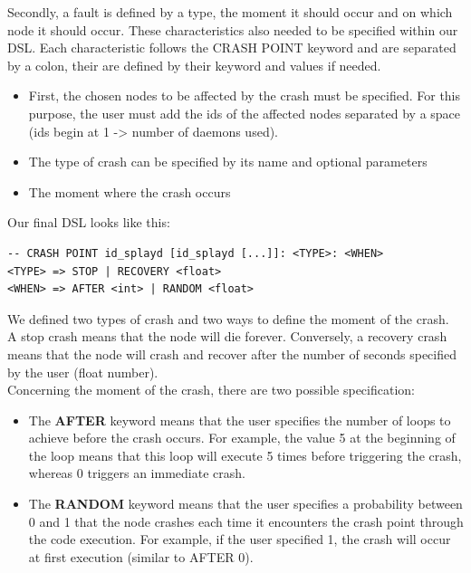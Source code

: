 \documentclass{eplmastersthesis}
\begin{document}
        Secondly, a fault is defined by a type, the moment it should occur and
        on which node it should occur. These characteristics also needed to
        be specified within our DSL. Each characteristic follows the
        \textsc{CRASH POINT} keyword and are separated by a colon, their are
        defined by their keyword and values if needed.

        \begin{itemize}
          \item First, the chosen nodes to be affected by the crash must be
          specified. For this purpose, the user must add the ids of the
          affected nodes separated by a space (ids begin at 1 -> number of
          daemons used).
          \item The type of crash can be specified by its name and optional
          parameters
          \item The moment where the crash occurs
        \end{itemize}

        Our final DSL looks like this:

        \begin{lstlisting}[style=MyBash]
-- CRASH POINT id_splayd [id_splayd [...]]: <TYPE>: <WHEN>
<TYPE> => STOP | RECOVERY <float>
<WHEN> => AFTER <int> | RANDOM <float>
        \end{lstlisting}

        We defined two types of crash and two ways to
        define the moment of the crash.\\
        A stop crash means that the node will die forever. Conversely, a
        recovery crash means that the node will crash and recover after the
        number of seconds specified by the user (float number).\\
        Concerning the moment of the crash, there are two possible specification:

        \begin{itemize}
          \item The \textbf{AFTER} keyword means that the user specifies the
          number of loops to achieve before the crash occurs. For example,
          the value 5 at the beginning of the loop means that this loop will
          execute 5 times before triggering the crash, whereas 0 triggers
          an immediate crash.
          \item The \textbf{RANDOM} keyword means that the user specifies a
          probability between 0 and 1 that the node crashes each time it
          encounters the crash point through the code execution. For example,
          if the user specified 1, the crash will occur at first execution
          (similar to AFTER 0).
        \end{itemize}
\end{document}
